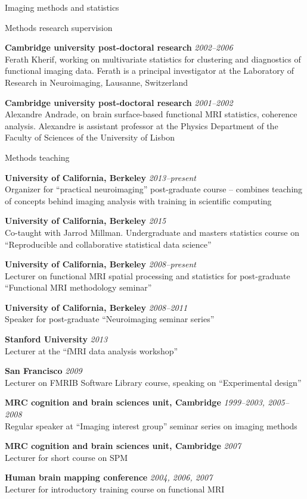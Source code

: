 \documentclass{cv}
\newcommand{\PlaceDateNote}[3]{{\bf #1} \hfill {\em #2} \\#3}
\newcommand{\UCB}{University of California, Berkeley}
\newcommand{\CBU}{MRC cognition and brain sciences unit, Cambridge}
\begin{document}
\begin{cvSection}{Imaging methods and statistics}

\begin{cvSubSection}{Methods research supervision}

\PlaceDateNote{Cambridge university post-doctoral research}{2002--2006}
{Ferath Kherif, working on multivariate statistics for clustering and
diagnostics of functional imaging data. Ferath is a principal investigator at
the Laboratory of Research in Neuroimaging, Lausanne, Switzerland}

\PlaceDateNote{Cambridge university post-doctoral research}{2001--2002}
{Alexandre Andrade, on brain surface-based functional MRI statistics, coherence
analysis.  Alexandre is assistant professor at the Physics Department of the
Faculty of Sciences of the University of Lisbon}

\end{cvSubSection}

\begin{cvSubSection}{Methods teaching}

\PlaceDateNote{\UCB}{2013--present}
{Organizer for ``practical neuroimaging'' post-graduate course -- combines
teaching of concepts behind imaging analysis with training in scientific
computing}

\PlaceDateNote{\UCB}{2015}
{Co-taught with Jarrod Millman.  Undergraduate and masters statistics course
on ``Reproducible and collaborative statistical data science''}

\PlaceDateNote{\UCB}{2008--present}
{Lecturer on functional MRI spatial processing and statistics for
post-graduate ``Functional MRI methodology seminar''}

\PlaceDateNote{\UCB}{2008--2011}
{Speaker for post-graduate ``Neuroimaging seminar series''}

\PlaceDateNote{Stanford University}{2013}
{Lecturer at the ``fMRI data analysis workshop''}

\PlaceDateNote{San Francisco}{2009}
{Lecturer on FMRIB Software Library course, speaking on ``Experimental
design''}

\PlaceDateNote{\CBU}{1999--2003, 2005--2008}
{Regular speaker at ``Imaging interest group'' seminar series on imaging
methods}

\PlaceDateNote{\CBU}{2007}
{Lecturer for short course on SPM}

\PlaceDateNote{Human brain mapping conference}{2004, 2006, 2007}
{Lecturer for introductory training course on functional MRI}


\end{cvSubSection}
\end{cvSection}
\end{document}
